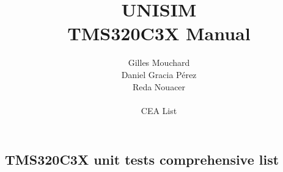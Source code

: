 \documentclass[a4paper,11pt]{article}
\title{UNISIM\\ TMS320C3X Manual}
\author{Gilles Mouchard \\Daniel Gracia P\'erez \\Reda Nouacer \\ \\CEA List}
\date{}
\begin{document}


\maketitle


\newpage

\begin{appendix}
\section{TMS320C3X unit tests comprehensive list}
\label{tms320c3x_unit_tests_list}

\end{appendix}
\end{document}

